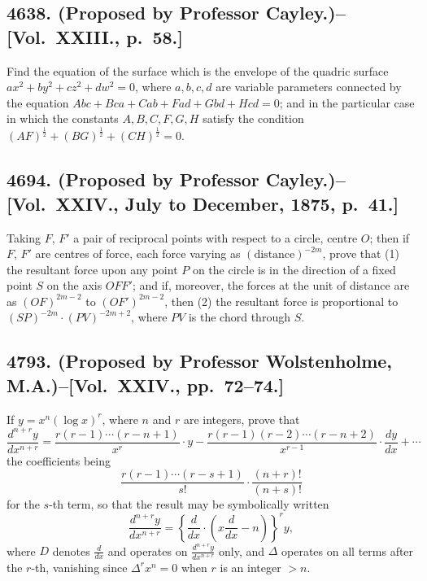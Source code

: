 \documentclass[11pt,a4paper]{book}
\begin{document}
\newpage

\subsection*{4638. (Proposed by Professor Cayley.)\---[Vol.~XXIII., p.~58.]}

Find the equation of the surface which is the envelope of the quadric surface $ax^2+by^2+cz^2+dw^2=0$, where $a,b,c,d$ are variable parameters connected by the equation $Abc+Bca+Cab+Fad+Gbd+Hcd=0$; and in the particular case in which the constants $A,B,C,F,G,H$ satisfy the condition $(AF)^{\frac{1}{2}}+(BG)^{\frac{1}{2}}+(CH)^{\frac{1}{2}}=0$.

\subsection*{4694. (Proposed by Professor Cayley.)\---[Vol.~XXIV., July to December, 1875, p.~41.]}

Taking $F$, $F'$ a pair of reciprocal points with respect to a circle, centre $O$; then if $F$, $F'$ are centres of force, each force varying as $(\text{distance})^{-2m}$, prove that (1) the resultant force upon any point $P$ on the circle is in the direction of a fixed point $S$ on the axis $OFF'$; and if, moreover, the forces at the unit of distance are as $(OF)^{2m-2}$ to $(OF')^{2m-2}$, then (2) the resultant force is proportional to $(SP)^{-2m} \cdot (PV)^{-2m+2}$, where $PV$ is the chord through $S$.

\newpage

\subsection*{4793. (Proposed by Professor Wolstenholme, M.A.)\---[Vol.~XXIV., pp.~72--74.]}

If $y = x^n (\log x)^r$, where $n$ and $r$ are integers, prove that
\[
\frac{d^{n+r}y}{dx^{n+r}} = \frac{r(r-1)\cdots(r-n+1)}{x^r} \cdot y
- \frac{r(r-1)(r-2)\cdots(r-n+2)}{x^{r-1}} \cdot \frac{dy}{dx}
+ \cdots
\]
the coefficients being
\[
\frac{r(r-1)\cdots(r-s+1)}{s!} \cdot \frac{(n+r)!}{(n+s)!}
\]
for the $s$-th term, so that the result may be symbolically written
\[
\frac{d^{n+r}y}{dx^{n+r}} = \left\{ \frac{d}{dx} \cdot \left( x\frac{d}{dx} - n \right) \right\}^r y,
\]
where $D$ denotes $\frac{d}{dx}$ and operates on $\frac{d^{n+r}y}{dx^{n+r}}$ only, and $\Delta$ operates on all terms after the $r$-th, vanishing since $\Delta^r x^n = 0$ when $r$ is an integer $>n$.
\end{document}
